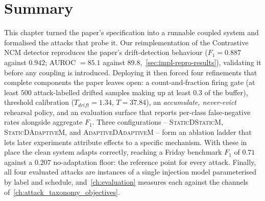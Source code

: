 \section{Summary}
\label{sec:impl-summary}
This chapter turned the paper's specification into a runnable coupled system and formalised the attacks that probe it. Our reimplementation of the Contrastive NCM detector reproduces the paper's drift-detection behaviour ($F_1 = 0.887$ against $0.942$; AUROC $= 85.1$ against $89.8$,~\cref{sec:impl-repro-results}), validating it before any coupling is introduced. Deploying it then forced four refinements that complete components the paper leaves open: a count-and-fraction firing gate (at least $500$ attack-labelled drifted samples making up at least $0.3$ of the buffer), threshold calibration ($T_{drift} = 1.34$, $T = 37.84$), an \emph{accumulate, never-evict} rehearsal policy, and an evaluation surface that reports per-class false-negative rates alongside aggregate $F_1$. Three configurations -- \textsc{StaticDStaticM}, \textsc{StaticDAdaptiveM}, and \textsc{AdaptiveDAdaptiveM} -- form an ablation ladder that lets later experiments attribute effects to a specific mechanism. With these in place the clean system adapts correctly, reaching a Friday benchmark $F_1$ of $0.71$ against a $0.207$ no-adaptation floor: the reference point for every attack. Finally, all four evaluated attacks are instances of a single injection model parameterised by label and schedule, and~\cref{ch:evaluation} measures each against the channels of~\cref{ch:attack_taxonomy_objectives}.
